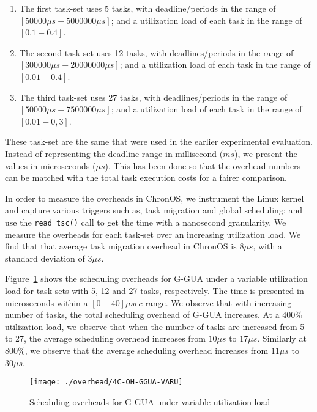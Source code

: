 \documentclass[12pt,dvips]{report}
\begin{document}
\begin{enumerate}
	\item The first task-set uses 5 tasks, with deadline/periods in the range of $[50000 \mu s - 5000000 \mu s]$; and a utilization load of each task in the range of $[0.1 - 0.4]$.
	\item The second task-set uses 12 tasks, with deadlines/periods in the range of $[300000 \mu s - 20000000 \mu s]$; and a utilization load of each task in the range of $[0.01 - 0.4]$.
	\item The third task-set uses 27 tasks, with deadlines/periods in the range of $[50000 \mu s - 7500000 \mu s]$; and a utilization load of each task in the range of $[0.01 - 0,3]$.
\end{enumerate}

These task-set are the same that were used in the earlier experimental evaluation. Instead of representing the deadline range in millisecond ($ms$), we present the values in microseconds ($\mu s$). This has been done so that the overhead numbers can be matched with the total task execution costs for a fairer comparison.

In order to measure the overheads in ChronOS, we instrument the Linux kernel and capture various triggers such as, task migration and global scheduling; and use the \texttt{read\_tsc()} call to get the time with a nanosecond granularity. We measure the overheads for each task-set over an increasing utilization load. We find that that average task migration overhead in ChronOS is $8 \mu s$, with a standard deviation of $3 \mu s$.

Figure~\ref{fig:4C-OH-GGUA-VARU} shows the scheduling overheads for G-GUA under a variable utilization load for task-sets with 5, 12 and 27 tasks, respectively. The time is presented in microseconds within a $[0-40]\mu sec$ range. We observe that with increasing number of tasks, the total scheduling overhead of G-GUA increases. At a 400\% utilization load, we observe that when the number of tasks are increased from 5 to 27, the average scheduling overhead increases from $10 \mu s$ to $17 \mu s$. Similarly at 800\%, we observe that the average scheduling overhead increases from $11 \mu s$ to $30 \mu s$. 

\begin{figure} [htbp]
  \centering
  \texttt{[image: ./overhead/4C-OH-GGUA-VARU]}
  \caption{Scheduling overheads for G-GUA under variable utilization load}
  \label{fig:4C-OH-GGUA-VARU}
\end{figure}
\end{document}
